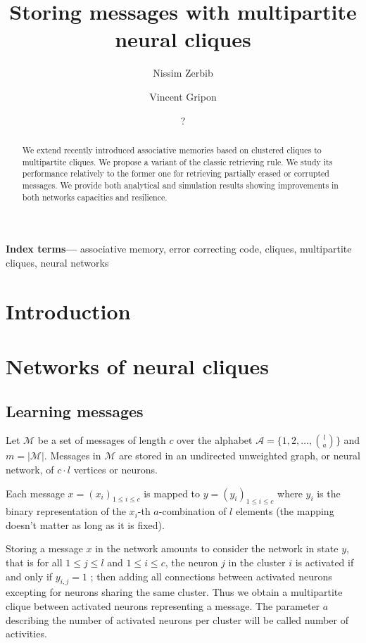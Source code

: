 \documentclass[english,11pt,twocolumn]{article}
\title{Storing messages with multipartite neural cliques}
\author[]{Nissim Zerbib}
\affil{Département d'Informatique, École normale supérieure, Paris, France}
\author[]{Vincent Gripon}
\affil{Département d'Électronique, Télécom Bretagne, Brest, France}
\author{?}
\date{
	}
\renewcommand{\le}{\leqslant}
\theoremstyle{definition}
\providecommand{\keywords}[1]{\textbf{Index terms---} #1}
\begin{document}
	\maketitle

	 \begin{abstract}
	 	We extend recently introduced associative memories based on clustered cliques to multipartite cliques. We propose a variant of the classic retrieving rule. We study its performance relatively to the former one for retrieving partially erased or corrupted messages. We provide both analytical and simulation results showing improvements in both networks capacities and resilience.
	 \end{abstract}
	 
	\keywords{associative memory, error correcting code, cliques, multipartite cliques, neural networks}
	
	\section{Introduction}
	
	
	
	\section{Networks of neural cliques}
		
	\subsection{Learning messages}
		
	Let $\mathcal{M}$ be a set of messages of length $c$ over the alphabet $\mathcal{A} = \{1, 2, \hdots, {l \choose a}\}$ and $m = | \mathcal{M} |$. Messages in $\mathcal{M}$ are stored in an undirected unweighted graph, or neural network, of $c \cdot l$ vertices or neurons. 
	
	Each message $x = (x_i)_{1 \le i \le c}$ is mapped to $y = (y_i)_{1 \le i \le c}$ where $y_i$ is the binary representation of the $x_i$-th $a$-combination of $l$ elements (the mapping doesn't matter as long as it is fixed).
	
	Storing a message $x$ in the network amounts to consider the network in state $y$, that is for all $1 \le j \le l$ and $1 \le i \le c$, the neuron $j$ in the cluster $i$ is activated if and only if $y_{i,j} = 1$ ; then adding all connections between activated neurons excepting for neurons sharing the same cluster. Thus we obtain a multipartite clique between activated neurons representing a message. The parameter $a$ describing the number of activated neurons per cluster will be called number of activities.
		
\end{document}
